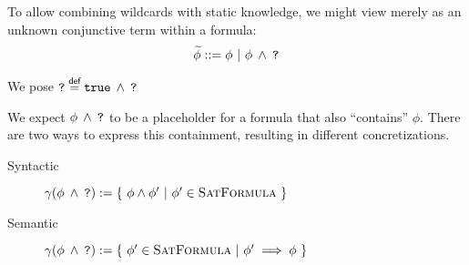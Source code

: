
To allow combining wildcards with static knowledge, we might view \qm merely as an unknown conjunctive term within a formula:
\begin{displaymath}
\widetilde{\phi} ::= \phi ~|~ \texttt{$\phi\:\wedge\:\texttt{?}$}
\end{displaymath}

We pose $\texttt{?} \overset{\textsf{def}}{=} \texttt{$\texttt{true}\:\wedge\:\texttt{?}$}$

We expect $\texttt{$\phi\:\wedge\:\texttt{?}$}$ to be a placeholder for a formula that also “contains” $\phi$.
There are two ways to express this containment, resulting in different concretizations.
\begin{description}
    \item[Syntactic]
    $\gamma(\texttt{$\phi\:\wedge\:\texttt{?}$}) := \{~ \phi \wedge \phi' ~|~ \phi' \in \textsc{SatFormula} ~\}$
    \item[Semantic]
    $\gamma(\texttt{$\phi\:\wedge\:\texttt{?}$}) := \{~ \phi' \in \textsc{SatFormula} ~|~ \phi' \implies \phi ~\}$
\end{description}